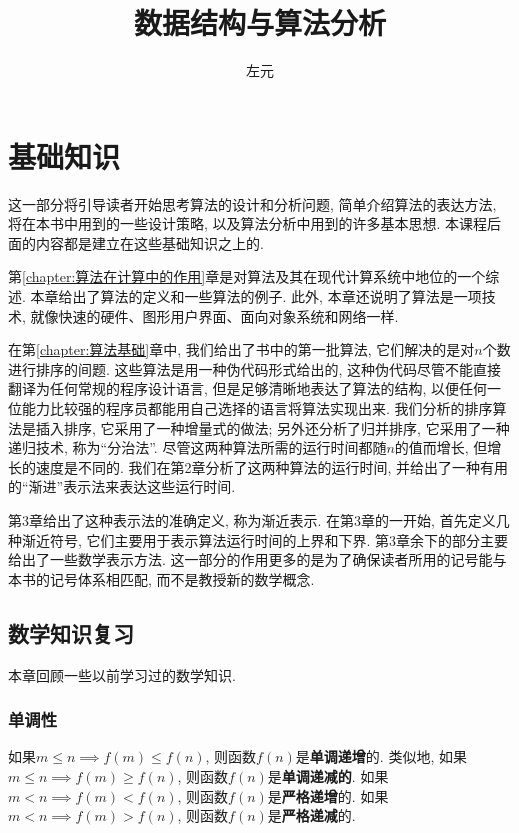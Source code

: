 \documentclass[oneside,10pt,fontset=none]{ctexbook}
\title{数据结构与算法分析}
\author{左元}
\numberwithin{definition}{chapter}
\numberwithin{theorem}{chapter}
\numberwithin{lemma}{chapter}
\begin{document}
\maketitle
\tableofcontents

\part{基础知识}

这一部分将引导读者开始思考算法的设计和分析问题, 简单介绍算法的表达方法, 将在本书中用到的一些设计策略, 以及算法分析中用到的许多基本思想. 本课程后面的内容都是建立在这些基础知识之上的.

第\ref{chapter:算法在计算中的作用}章是对算法及其在现代计算系统中地位的一个综述. 本章给出了算法的定义和一些算法的例子. 此外, 本章还说明了算法是一项技术, 就像快速的硬件、图形用户界面、面向对象系统和网络一样.

在第\ref{chapter:算法基础}章中, 我们给出了书中的第一批算法, 它们解决的是对$n$个数进行排序的间题. 这些算法是用一种伪代码形式给出的, 这种伪代码尽管不能直接翻译为任何常规的程序设计语言, 但是足够清晰地表达了算法的结构, 以便任何一位能力比较强的程序员都能用自己选择的语言将算法实现出来. 我们分析的排序算法是插入排序, 它采用了一种增量式的做法; 另外还分析了归并排序, 它采用了一种递归技术, 称为``分治法''. 尽管这两种算法所需的运行时间都随$n$的值而增长, 但增长的速度是不同的. 我们在第2章分析了这两种算法的运行时间, 并给出了一种有用的``渐进''表示法来表达这些运行时间.

第3章给出了这种表示法的准确定义, 称为渐近表示. 在第3章的一开始, 首先定义几种渐近符号, 它们主要用于表示算法运行时间的上界和下界. 第3章余下的部分主要给出了一些数学表示方法. 这一部分的作用更多的是为了确保读者所用的记号能与本书的记号体系相匹配, 而不是教授新的数学概念.

\chapter{数学知识复习}\label{chapter:数学知识复习}

本章回顾一些以前学习过的数学知识.

\section{单调性}

如果$m\leq n \implies f(m)\leq f(n)$, 则函数$f(n)$是\textbf{单调递增}的. 类似地, 如果$m\leq n \implies f(m)\geq f(n)$, 则函数$f(n)$是\textbf{单调递减的}. 如果$m<n \implies f(m)<f(n)$, 则函数$f(n)$是\textbf{严格递增}的. 如果$m<n \implies f(m)>f(n)$, 则函数$f(n)$是\textbf{严格递减}的.
\end{document}
